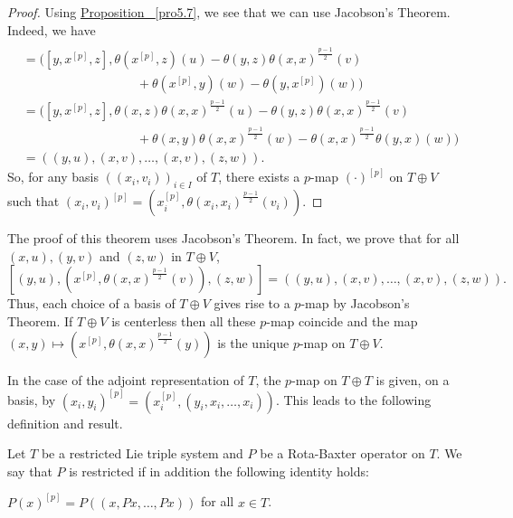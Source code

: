 \documentclass[11pt, twoside]{article}
\begin{document}
\begin{proof}
     Using \hyperref[pro5.7]{Proposition ~\ref*{pro5.7}}, we see that we can use Jacobson's Theorem. Indeed, we have \begin{align*}
        [(y&,u),(x^{[p]},\theta(x,x)^{\frac{p-1}{2}}(v)),(z,w)] \\ &= ([y,x^{[p]},z], \theta(x^{[p]},z)(u) - \theta(y,z)\theta(x,x)^{\frac{p-1}{2}}(v)\\& \quad\quad\quad\quad\quad\quad\quad\quad\quad + \theta(x^{[p]},y)(w) - \theta(y,x^{[p]})(w)) \\ & = ([y,x^{[p]},z], \theta(x,z)\theta(x,x)^{\frac{p-1}{2}}(u) - \theta(y,z)\theta(x,x)^{\frac{p-1}{2}}(v) \\ &\quad\quad\quad\quad\quad\quad\quad\quad\quad + \theta(x,y)\theta(x,x)^{\frac{p-1}{2}}(w) - \theta(x,x)^{\frac{p-1}{2}}\theta(y,x)(w)) \\ & = ((y,u),(x,v),\dots,(x,v),(z,w)).
    \end{align*} So, for any basis $((x_i,v_i))_{i\in I} $ of $T $, there exists a $p$-map $(\cdot)^{[p]}$ on $T\oplus V $ such that $(x_i,v_i)^{[p]}= (x_i^{[p]},\theta(x_i,x_i)^{\frac{p-1}{2}}(v_i)) $.
\end{proof}

\begin{rmq}
    The proof of this theorem uses Jacobson's Theorem. In fact, we prove that for all $(x,u),(y,v)$ and $(z,w)$ in $ T\oplus V$, $$[(y,u),(x^{[p]},\theta(x,x)^{\frac{p-1}{2}}(v)),(z,w)]= ((y,u),(x,v),\dots,(x,v),(z,w)). $$ Thus, each choice of a basis of $T\oplus V $ gives rise to a $p$-map by Jacobson's Theorem. If $T\oplus V$ is centerless then all these $p$-map coincide and the map $(x,y)\mapsto (x^{[p]},\theta(x,x)^{\frac{p-1}{2}}(y)) $ is the unique $p$-map on $T\oplus V$.
\end{rmq}

In the case of the adjoint representation of $T$, the $p$-map on $T\oplus T $ is given, on a basis, by $(x_i,y_i)^{[p]}= (x_i^{[p]}, (y_i,x_i,\ldots,x_i)) $. This leads to the following definition and  result.

\begin{defi}\label{d5.6}
    Let $T$ be a restricted Lie triple system and $P$ be a Rota-Baxter operator on $T$. We say that $P$ is  restricted if in addition the following identity holds: \begin{center}
        $P(x)^{[p]}= P((x,Px,\ldots, Px)) $ for all $x\in T$.
    \end{center} 
\end{defi}
\end{document}
